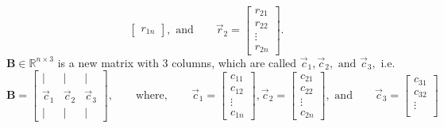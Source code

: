 \documentclass[11pt]{article}
\def\R{\mathbb{R}} %
\def\B{\textbf{B}}
\begin{document}
\begin{enumerate}
\begin{enumerate}
\[\begin{bmatrix}
                                r_{1n}
                    \end{bmatrix},
                    \text{ and}
                    \qquad
                    \vec r_2 = \begin{bmatrix}
                                r_{21} \\
                                r_{22} \\
                                \vdots \\
                                r_{2n}
                    \end{bmatrix}.
                \]
                $\B \in \R^{n\times 3}$ is a new matrix with 3 columns, which are called $\vec c_1, \vec c_2,\text{ and }\vec c_3,$ i.e.
                \[
                    \B = \begin{bmatrix}
                            \mid & \mid & \mid \\
                            \vec c_1 & \vec c_2 & \vec c_3 \\
                            \mid & \mid & \mid
                         \end{bmatrix},
                         \qquad 
                        \text{where}, 
                        \qquad
                        \vec c_1 = \begin{bmatrix}
                                    c_{11} \\
                                    c_{12} \\
                                    \vdots \\
                                    c_{1n}
                        \end{bmatrix},
                        \vec c_2 = \begin{bmatrix}
                                    c_{21} \\
                                    c_{22} \\
                                    \vdots \\
                                    c_{2n}
                        \end{bmatrix},
                        \text{ and}
                        \qquad
                        \vec c_3 = \begin{bmatrix}
                                    c_{31} \\
                                    c_{32} \\
                                    \vdots \\

\end{bmatrix}\]
\end{enumerate}
\end{enumerate}
\end{document}
